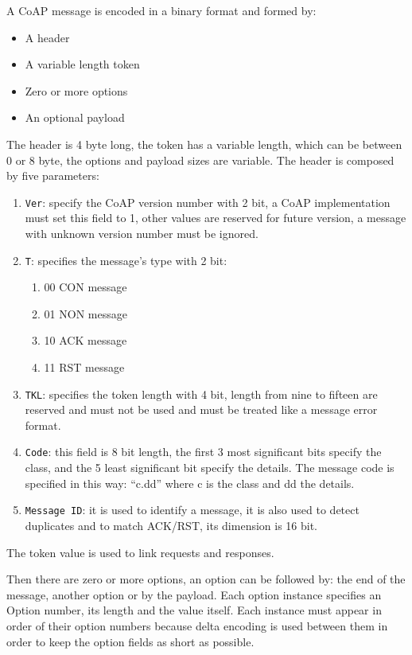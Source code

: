 	A CoAP message is encoded in a binary format and formed by:\newline
	\begin{itemize}
		\item A header
		\item A variable length token
		\item Zero or more options
		\item An optional payload
	\end{itemize}
	The header is 4 byte long, the token has a variable length, which can be between 0 or 8 byte, the options and payload sizes are variable.\newline
	The header is composed by five parameters:\newline
	\begin{enumerate}
		\item \texttt{Ver}: specify the CoAP version number with 2 bit, a CoAP implementation must set this field to 1, other values are reserved for future version, a message with unknown version number must be ignored.
		\item \texttt{T}: specifies the message's type with 2 bit:
		\begin{enumerate}
			\item 00 CON message
			\item 01 NON message
			\item 10 ACK message
			\item 11 RST message
		\end{enumerate}
		\item \texttt{TKL}: specifies the token length with 4 bit, length from nine to fifteen are reserved and must not be used and must be treated like a message error format.
		\item \texttt{Code}: this field is 8 bit length, the first 3 most significant bits specify the class, and the 5 least significant bit specify the details.
		The message code is specified in this way: “c.dd” where c is the class and dd the details.
		\item \texttt{Message ID}: it is used to identify a message, it is also used to detect duplicates and to match ACK/RST, its dimension is 16 bit.
	\end{enumerate}
	
	The token value is used to link requests and responses.\newline

	Then there are zero or more options, an option can be followed by: the end of the message, another option or by the payload.\newline
	Each option instance specifies an Option number, its length and the value itself.\newline
	Each instance must appear in order of their option numbers because delta encoding is used between them in order to keep the option fields as short as possible.\newline
	
